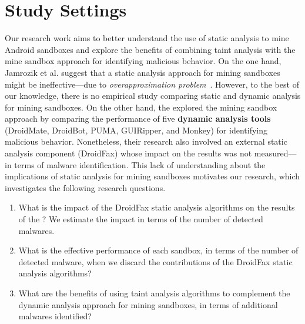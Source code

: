 \section{Study Settings}


Our research work aims to better understand
the use of static analysis to mine Android sandboxes
and explore the benefits of combining taint analysis
with the mine sandbox approach for identifying malicious
behavior. 
On the one hand, Jamrozik et al. suggest that a 
static analysis approach for mining sandboxes
might be ineffective---due to \emph{overapproximation
problem}~\cite{DBLP:conf/icse/JamrozikSZ16}.
However, to the best of our knowledge,
there is no empirical study comparing
static and dynamic analysis for mining sandboxes.
On the other hand, the \blls explored the mining sandbox approach by comparing
the performance of five {\bf dynamic analysis tools} (DroidMate, DroidBot, PUMA,
GUIRipper, and Monkey) for identifying
malicious behavior. Nonetheless, their
research also involved an external static analysis component (DroidFax)
whose impact on the results was not measured---in terms of malware
identification. 
This lack of understanding about the implications of
static analysis for mining sandboxes motivates
our research, which investigates the following research questions.

\begin{enumerate}[(RQ1)]

\item What is the impact of the DroidFax static analysis algorithms on the results of the \blls?
  We estimate the impact in terms of the number of detected malwares. 
  
  
 \item What is the effective performance of each sandbox, in terms of the number of detected malware, when we
   discard the contributions of the DroidFax static analysis algorithms?

 \item What are the benefits of using taint
   analysis algorithms to complement the dynamic analysis approach for mining sandboxes,
   in terms of additional malwares identified?
\end{enumerate}

